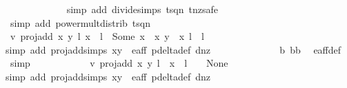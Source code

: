 \begin{isabellebody}
\ \ \ \ \ \ \ \ \ \ \ \ \isamarkupfalse%
{\isacharparenleft}simp\ add{\isacharcolon}\ divide{\isacharunderscore}simps\ t{\isacharunderscore}sq{\isacharunderscore}n{}\ t{\isacharunderscore}nz{\isacharcomma}safe{\isacharparenright}\isanewline
\ \ \ \ \ \ \ \ \ \ \ \ \isamarkupfalse%
\ {\isacharparenleft}simp\ add{\isacharcolon}\ power{\isacharunderscore}mult{\isacharunderscore}distrib\ t{\isacharunderscore}sq{\isacharunderscore}n{}{\isacharparenright}\isanewline
\ \ \ \ \ \ \ \ \ \ \isamarkupfalse%
\ v{}{\isacharcolon}\ {\isachardoublequoteopen}proj{\isacharunderscore}add\ {\isacharparenleft}{\isacharparenleft}x{\isacharcomma}\ y{\isacharparenright}{\isacharcomma}\ l{\isacharparenright}\ {\isacharparenleft}{\isacharparenleft}x{\isacharprime}{\isacharcomma}\ {}{\isacharparenright}{\isacharcomma}\ l{\isacharprime}{\isacharparenright}\ {\isacharequal}\ Some\ {\isacharparenleft}{\isacharparenleft}x\ {\isacharasterisk}\ x{\isacharprime}{\isacharcomma}\ y\ {\isacharasterisk}\ x{\isacharprime}{\isacharparenright}{\isacharcomma}\ l\ {\isacharplus}\ l{\isacharprime}{\isacharparenright}{\isachardoublequoteclose}\isanewline
\ \ \ \ \ \ \ \ \ \ \ \ \isamarkupfalse%
{\isacharparenleft}simp\ add{\isacharcolon}\ proj{\isacharunderscore}add{\isachardot}simps\ {\isacartoucheopen}{\isacharparenleft}x{\isacharcomma}y{\isacharparenright}\ {\isasymin}\ e{\isacharunderscore}aff{\isacartoucheclose}\ p{\isacharunderscore}delta{\isacharunderscore}def\ d{\isacharunderscore}{}{\isacharunderscore}nz{\isacharparenright}\isanewline
\ \ \ \ \ \ \ \ \ \ \ \ \isamarkupfalse%
\ b\ bb\ \isamarkupfalse%
\ e{\isacharunderscore}aff{\isacharunderscore}{}{\isacharunderscore}def\ \isamarkupfalse%
\ simp\isanewline
\ \ \ \ \ \ \ \ \ \ \isamarkupfalse%
\ v{}{\isacharcolon}\ {\isachardoublequoteopen}proj{\isacharunderscore}add\ {\isacharparenleft}{\isacharparenleft}x{\isacharcomma}\ y{\isacharparenright}{\isacharcomma}\ l{\isacharparenright}\ {\isacharparenleft}{\isasymtau}\ {\isacharparenleft}x{\isacharprime}{\isacharcomma}\ {}{\isacharparenright}{\isacharcomma}\ l{\isacharprime}\ {\isacharplus}\ {}{\isacharparenright}\ {\isacharequal}\ None{\isachardoublequoteclose}\isanewline
\ \ \ \ \ \ \ \ \ \ \ \ \isamarkupfalse%
{\isacharparenleft}simp\ add{\isacharcolon}\ proj{\isacharunderscore}add{\isachardot}simps\ {\isacartoucheopen}{\isacharparenleft}x{\isacharcomma}y{\isacharparenright}\ {\isasymin}\ e{\isacharunderscore}aff{\isacartoucheclose}\ p{\isacharunderscore}delta{\isacharunderscore}def\ d{\isacharunderscore}{}{\isacharunderscore}nz{\isacharparenright}\isanewline

\end{isabellebody}
